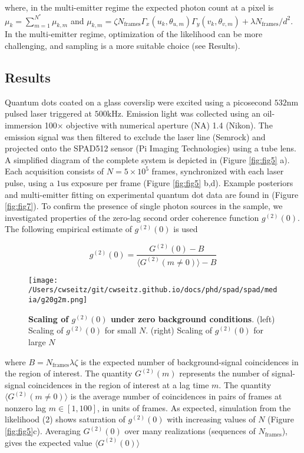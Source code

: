 where, in the multi-emitter regime the expected photon count at a pixel is $\mu_{k} = \sum_{m=1}^{N^{*}} \mu_{k,m}$ and $\mu_{k,m}=\zeta N_{\mathrm{frames}}\Gamma_{x}(u_k,\theta_{u,m})\Gamma_{y}(v_k,\theta_{v,m}) + \lambda N_{\mathrm{frames}}/d^{2}$. In the multi-emitter regime, optimization of the likelihood can be more challenging, and sampling is a more suitable choice (see Results). 


\subsection{Results}

Quantum dots coated on a glass coverslip were excited using a picosecond $532\mathrm{nm}$ pulsed laser triggered at $500\mathrm{kHz}$. Emission light was collected using an oil-immersion 100$\times$ objective with numerical aperture (NA) 1.4 (Nikon). The emission signal was then filtered to exclude the laser line (Semrock) and projected onto the SPAD512 sensor (Pi Imaging Technologies) using a tube lens. A simplified diagram of the complete system is depicted in (Figure \ref{fig:fig5} a). Each acquisition consists of $N=5\times 10^{5}$ frames, synchronized with each laser pulse, using a $1\mathrm{us}$ exposure per frame (Figure \ref{fig:fig5} b,d). Example posteriors and multi-emitter fitting on experimental quantum dot data are found in (Figure \ref{fig:fig7}). To confirm the presence of single photon sources in the sample, we investigated properties of the zero-lag second order coherence function $g^{(2)}(0)$. The following empirical estimate of $g^{(2)}(0)$ is used \parencite{Israel2017}

\begin{equation}
g^{(2)}(0) = \frac{G^{(2)}(0)-B}{\langle G^{(2)}(m\neq 0)\rangle -B}
\end{equation}

\begin{figure}[t]
\centering
\texttt{[image: /Users/cwseitz/git/cwseitz.github.io/docs/phd/spad/spad/media/g20g2m.png]}
\caption{\textbf{Scaling of $g^{(2)}(0)$ under zero background conditions}. (left) Scaling of $g^{(2)}(0)$ for small $N$. (right) Scaling of $g^{(2)}(0)$ for large $N$}
\label{fig:fig8}
\end{figure}   

where $B = N_{\mathrm{frames}}\lambda\zeta$ is the expected number of background-signal coincidences in the region of interest. The quantity $G^{(2)}(m)$ represents the number of signal-signal coincidences in the region of interest at a lag time $m$. The quantity $\langle G^{(2)}(m\neq 0)\rangle$ is the average number of coincidences in pairs of frames at nonzero lag $m \in [1,100]$, in units of frames. As expected, simulation from the likelihood (2) shows saturation of $g^{(2)}(0)$  with increasing values of $N$ (Figure \ref{fig:fig5}c). Averaging $G^{(2)}(0)$ over many realizations (sequences of $N_{\mathrm{frames}}$), gives the expected value $\langle G^{(2)}(0)\rangle $

